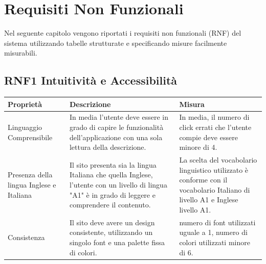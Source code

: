 \documentclass{report}
\begin{document}
\pagebreak

\section{Requisiti Non Funzionali}
Nel seguente capitolo vengono riportati i requisiti non funzionali (RNF) del sistema utilizzando tabelle strutturate e specificando misure facilmente misurabili.


\subsection*{RNF1 Intuitività e Accessibilità}
\begin{center} %
	\centering
	\begin{tabular}{ |p{3cm}|p{4cm}|p{4cm}|  }
		\hline
		\centering Proprietà & \qquad\quad Descrizione & \qquad\qquad Misura\\ %
		\hline
		Linguaggio Comprensibile & In media l’utente deve essere in grado di capire le funzionalità dell'applicazione con una
		sola lettura della descrizione. & In media, il numero di click errati che l'utente compie deve essere minore di 4. \\
		\hline
		Presenza della lingua Inglese e Italiana & Il sito presenta sia la lingua Italiana che quella Inglese, l'utente con un livello di lingua "A1" è in grado di leggere e comprendere il contenuto. & La scelta del vocabolario linguistico utilizzato è conforme con il vocabolario Italiano di livello A1 e Inglese livello A1.\\ %
		\hline
		Consistenza & Il sito deve avere un design consistente, utilizzando un singolo font e una palette fissa di colori. & numero di font utilizzati uguale a 1, numero di colori utilizzati minore di 6.  \\%
		\hline
	\end{tabular}
\end{center}
\end{document}
